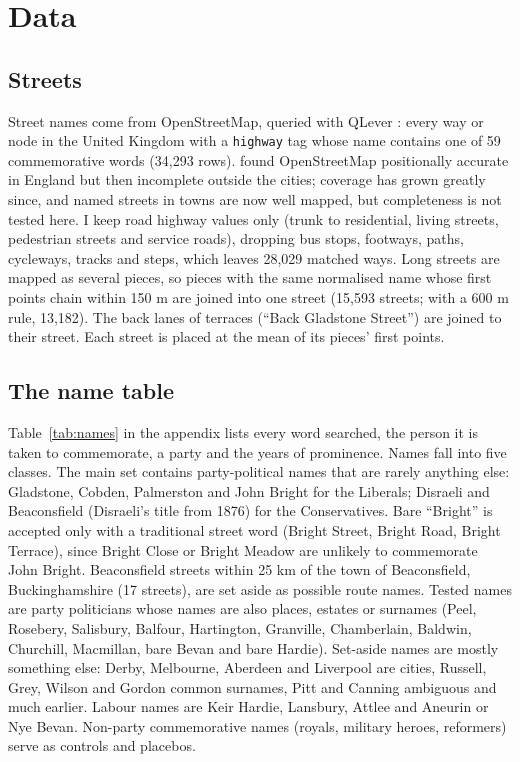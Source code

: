 \documentclass[11pt,a4paper]{article}
\begin{document}
\section{Data}
\subsection{Streets}
Street names come from OpenStreetMap, queried with QLever \citep{bast2017}: every way or node in the United Kingdom with a \texttt{highway} tag whose name contains one of 59 commemorative words (34,293 rows). \citet{haklay2010} found OpenStreetMap positionally accurate in England but then incomplete outside the cities; coverage has grown greatly since, and named streets in towns are now well mapped, but completeness is not tested here. I keep road highway values only (trunk to residential, living streets, pedestrian streets and service roads), dropping bus stops, footways, paths, cycleways, tracks and steps, which leaves 28,029 matched ways. Long streets are mapped as several pieces, so pieces with the same normalised name whose first points chain within 150 m are joined into one street (15,593 streets; with a 600 m rule, 13,182). The back lanes of terraces (``Back Gladstone Street'') are joined to their street. Each street is placed at the mean of its pieces' first points.

\subsection{The name table}
Table~\ref{tab:names} in the appendix lists every word searched, the person it is taken to commemorate, a party and the years of prominence. Names fall into five classes. The main set contains party-political names that are rarely anything else: Gladstone, Cobden, Palmerston and John Bright for the Liberals; Disraeli and Beaconsfield (Disraeli's title from 1876) for the Conservatives. Bare ``Bright'' is accepted only with a traditional street word (Bright Street, Bright Road, Bright Terrace), since Bright Close or Bright Meadow are unlikely to commemorate John Bright. Beaconsfield streets within 25 km of the town of Beaconsfield, Buckinghamshire (17 streets), are set aside as possible route names. Tested names are party politicians whose names are also places, estates or surnames (Peel, Rosebery, Salisbury, Balfour, Hartington, Granville, Chamberlain, Baldwin, Churchill, Macmillan, bare Bevan and bare Hardie). Set-aside names are mostly something else: Derby, Melbourne, Aberdeen and Liverpool are cities, Russell, Grey, Wilson and Gordon common surnames, Pitt and Canning ambiguous and much earlier. Labour names are Keir Hardie, Lansbury, Attlee and Aneurin or Nye Bevan. Non-party commemorative names (royals, military heroes, reformers) serve as controls and placebos.
\end{document}
